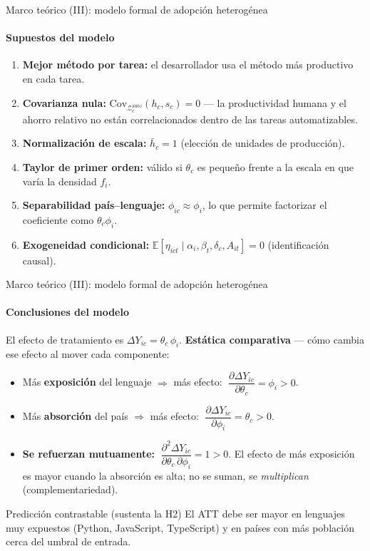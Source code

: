 \documentclass[10pt,aspectratio=169]{beamer}
\begin{document}
\begin{frame}{Marco teórico (III): modelo formal de adopción heterogénea}
\framesubtitle{Supuestos del modelo}
\small
\begin{enumerate}\small
  \item \textbf{Mejor método por tarea:} el desarrollador usa el método más productivo en cada tarea.
  \item \textbf{Covarianza nula:} $\mathrm{Cov}_{\mathcal{Z}^{\mathrm{auto}}_c}(h_c,s_c)=0$ --- la productividad humana y el ahorro relativo no están correlacionados dentro de las tareas automatizables.
  \item \textbf{Normalización de escala:} $\bar h_c=1$ (elección de unidades de producción).
  \item \textbf{Taylor de primer orden:} válido si $\theta_c$ es pequeño frente a la escala en que varía la densidad $f_i$.
  \item \textbf{Separabilidad país--lenguaje:} $\phi_{ic}\approx\phi_i$, lo que permite factorizar el coeficiente como $\theta_c\phi_i$.
  \item \textbf{Exogeneidad condicional:} $\mathbb{E}[\eta_{ict}\mid\alpha_i,\beta_t,\delta_c,A_{it}]=0$ (identificación causal).
\end{enumerate}
\end{frame}

\begin{frame}{Marco teórico (III): modelo formal de adopción heterogénea}
\framesubtitle{Conclusiones del modelo}
\small
El efecto de tratamiento es $\Delta Y_{ic}=\theta_c\,\phi_i$. \textbf{Estática comparativa} --- cómo cambia ese efecto al mover cada componente:
\begin{itemize}\small
  \item Más \textbf{exposición} del lenguaje $\Rightarrow$ más efecto: $\;\dfrac{\partial \Delta Y_{ic}}{\partial \theta_c}=\phi_i>0$.
  \item Más \textbf{absorción} del país $\Rightarrow$ más efecto: $\;\dfrac{\partial \Delta Y_{ic}}{\partial \phi_i}=\theta_c>0$.
  \item \textbf{Se refuerzan mutuamente:} $\;\dfrac{\partial^2 \Delta Y_{ic}}{\partial \theta_c\,\partial \phi_i}=1>0$. El efecto de más exposición es mayor cuando la absorción es alta; no se suman, se \emph{multiplican} (complementariedad).
\end{itemize}
\begin{exampleblock}{Predicción contrastable (sustenta la H2)}
\centering\small El ATT debe ser mayor en lenguajes muy expuestos (Python, JavaScript, TypeScript) y en países con más población cerca del umbral de entrada.
\end{exampleblock}
\end{frame}
\end{document}
